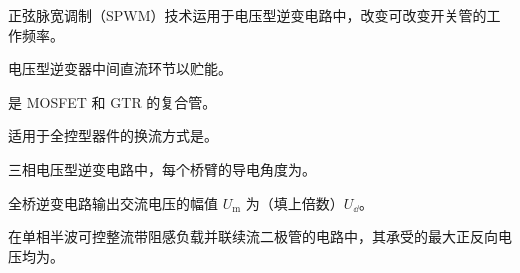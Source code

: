 \documentclass[电力电子]{subfiles}
\begin{document}
\begin{ti}
	正弦脉宽调制（SPWM）技术运用于电压型逆变电路中，改变可改变开关管的工作频率。
\end{ti}

\begin{ti}
	电压型逆变器中间直流环节以贮能。
\end{ti}

\begin{ti}
	是 MOSFET 和 GTR 的复合管。
\end{ti}

\begin{ti}
	适用于全控型器件的换流方式是。
\end{ti}

\begin{ti}
	三相电压型逆变电路中，每个桥臂的导电角度为。
\end{ti}

\begin{ti}
	全桥逆变电路输出交流电压的幅值 $U_{\mathrm{m}}$ 为（填上倍数）$U_{\dd}$。
\end{ti}

\begin{ti}
	在单相半波可控整流带阻感负载并联续流二极管的电路中，其承受的最大正反向电压均为。
\end{ti}
\end{document}
